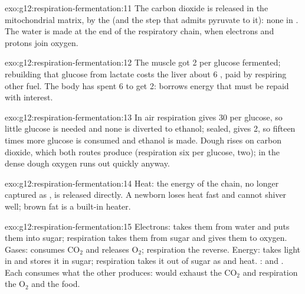 \begin{solution}{exo:g12:respiration-fermentation:11}
The carbon dioxide is released in the mitochondrial matrix, by the
 (and the step that admits pyruvate to it): none in
. The water is made at the end of the respiratory chain,
when electrons and protons join oxygen.
\end{solution}

\begin{solution}{exo:g12:respiration-fermentation:12}
The muscle got 2  per glucose fermented; rebuilding that glucose
from lactate costs the liver about 6 , paid by respiring other
fuel. The body has spent 6 to get 2:  borrows energy that
must be repaid with interest.
\end{solution}

\begin{solution}{exo:g12:respiration-fermentation:13}
In air respiration gives 30  per glucose, so little glucose is
needed and none is diverted to ethanol; sealed,  gives 2,
so fifteen times more glucose is consumed and ethanol is made. Dough
rises on carbon dioxide, which both routes produce (respiration six
per glucose,  two); in the dense dough oxygen runs out
quickly anyway.
\end{solution}

\begin{solution}{exo:g12:respiration-fermentation:14}
Heat: the energy of the chain, no longer captured as , is released
directly. A newborn loses heat fast and cannot shiver well; brown fat
is a built-in heater.
\end{solution}

\begin{solution}{exo:g12:respiration-fermentation:15}
Electrons:  takes them from water and puts them into
sugar; respiration takes them from sugar and gives them to oxygen.
Gases:  consumes $\mathrm{CO_2}$ and releases
$\mathrm{O_2}$; respiration the reverse. Energy:  takes
light in and stores it in sugar; respiration takes it out of sugar as
 and heat. :  and . Each consumes
what the other produces:  would exhaust the
$\mathrm{CO_2}$ and respiration the $\mathrm{O_2}$ and the food.
\end{solution}

